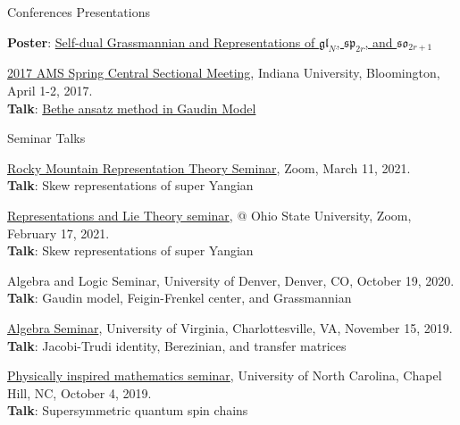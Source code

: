 \documentclass{resume} %
\begin{document}
\begin{rSection}{Conferences Presentations}
\begin{rSubsection}{}{}
{		{\bf Poster}: \href{https://kanglu.me/writings/poster-Reims.pdf}{Self-dual Grassmannian and Representations of $\mathfrak{gl}_N$, $\mathfrak{sp}_{2r}$, and $\mathfrak{so}_{2r+1}$}}\\
  \item {\href{http://www.ams.org/meetings/sectional/2233_program.html}{2017 AMS Spring Central Sectional Meeting}, Indiana University, Bloomington, April 1-2, 2017. \\
		{\bf Talk}: \href{https://kanglu.me/writings/ams-sec-2017.pdf}{Bethe ansatz method in Gaudin Model}}\\
\end{rSubsection}
\end{rSection}

\begin{rSection}{Seminar Talks}
\begin{rSubsection}{}{}
{}{}
  \item {\href{https://sites.google.com/view/rockymountainreptheory/home}{Rocky Mountain Representation Theory Seminar}, Zoom, March 11, 2021.\\
        {\bf Talk}: Skew representations of super Yangian}\\
  \item {\href{https://research.math.osu.edu/reps/}{Representations and Lie Theory seminar}, @ Ohio State University, Zoom, February 17, 2021.\\
        {\bf Talk}: Skew representations of super Yangian}\\
  \item {Algebra and Logic Seminar, University of Denver, Denver, CO, October 19, 2020. \\
		{\bf Talk}:  Gaudin model, Feigin-Frenkel center, and Grassmannian}\\
  \item {\href{https://math.virginia.edu/seminars/algebra/2019-20/}{Algebra Seminar}, University of Virginia, Charlottesville, VA, November 15, 2019. \\
		{\bf Talk}:  Jacobi-Trudi identity, Berezinian, and transfer matrices}\\
  \item {\href{https://math.virginia.edu/seminars/algebra/2019-20/}{Physically inspired mathematics seminar}, University of North Carolina, Chapel Hill, NC, October 4, 2019. \\
		{\bf Talk}: Supersymmetric quantum spin chains}\\
\end{rSubsection}
\end{rSection}
\end{document}
